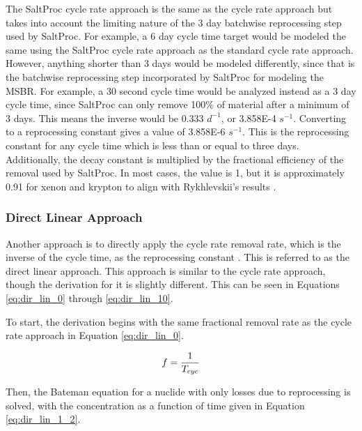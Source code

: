 The SaltProc cycle rate approach is the same as the cycle rate approach but takes into account the limiting nature of the 3 day batchwise reprocessing step used by SaltProc. For example, a 6 day cycle time target would be modeled the same using the SaltProc cycle rate approach as the standard cycle rate approach. However, anything shorter than 3 days would be modeled differently, since that is the batchwise reprocessing step incorporated by SaltProc for modeling the MSBR. For example, a 30 second cycle time would be analyzed instead as a 3 day cycle time, since SaltProc can only remove 100\% of material after a minimum of 3 days. This means the inverse would be 0.333 $d^{-1}$, or 3.858E-4 $s^{-1}$. Converting to a reprocessing constant gives a value of 3.858E-6 $s^{-1}$. This is the reprocessing constant for any cycle time which is less than or equal to three days. Additionally, the decay constant is multiplied by the fractional efficiency of the removal used by SaltProc. In most cases, the value is 1, but it is approximately 0.91 for xenon and krypton to align with Rykhlevskii's results \cite{rykhlevskii_fuel_2020}.

\subsubsection{Direct Linear Approach}
\label{s:DL}

Another approach is to directly apply the cycle rate removal rate, which is the inverse of the cycle time, as the reprocessing constant \cite{hombourger_eql0d_2020}. This is referred to as the direct linear approach. This approach is similar to the cycle rate approach, though the derivation for it is slightly different. This can be seen in Equations \eqref{eq:dir_lin_0} through \eqref{eq:dir_lin_10}.%

To start, the derivation begins with the same fractional removal rate as the cycle rate approach in Equation \eqref{eq:dir_lin_0}.

\begin{equation} \hfill
f = \frac{1}{T_{cyc}}
\hfill\label{eq:dir_lin_0} \end{equation}

Then, the Bateman equation for a nuclide with only losses due to reprocessing is solved, with the concentration as a function of time given in Equation \eqref{eq:dir_lin_1_2}.


